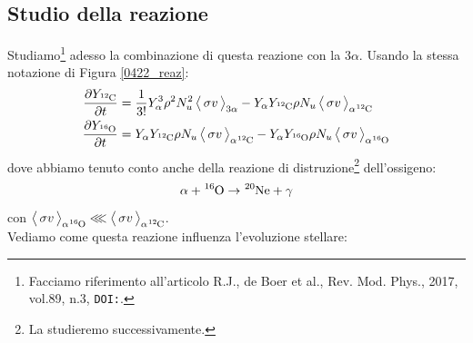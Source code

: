 \subsection{Studio della reazione} Studiamo\footnote{Facciamo riferimento all'articolo R.J., de Boer et al., {Rev. Mod. Phys.}, 2017, vol.89, n.3, \texttt{DOI:}.} adesso la combinazione di questa reazione con la $3\alpha$. Usando la stessa notazione di Figura \ref{0422_reaz}:
\begin{align*}
	\tderpar{Y_{\ce{^{12}C}}} &= \frac{1}{3!} Y_{\alpha}^3 \rho^2 N_u^2 \, \mean{\sigma v}_{3\alpha} - Y_\alpha Y_{\ce{^{12}C}} \rho N_u \, \mean{\sigma v}_{\alpha\ce{^{12}C}} \\
	\tderpar{Y_{\ce{^{16}O}}} &= Y_\alpha Y_{\ce{^{12}C}} \rho N_u \, \mean{\sigma v}_{\alpha\ce{^{12}C}} - Y_\alpha Y_{\ce{^{16}O}} \rho N_u \, \mean{\sigma v}_{\alpha\ce{^{16}O}}	
\end{align*}
dove abbiamo tenuto conto anche della reazione di distruzione\footnote{La studieremo successivamente.} dell'ossigeno:
$$\alpha + \ce{^{16}O} \to \ce{^{20}Ne} + \gamma$$
con $\mean{\sigma v}_{\alpha \ce{^{16}O}}\lll \mean{\sigma v}_{\alpha \ce{^{12}C}}$.\\ 
Vediamo come questa reazione influenza l'evoluzione stellare:
